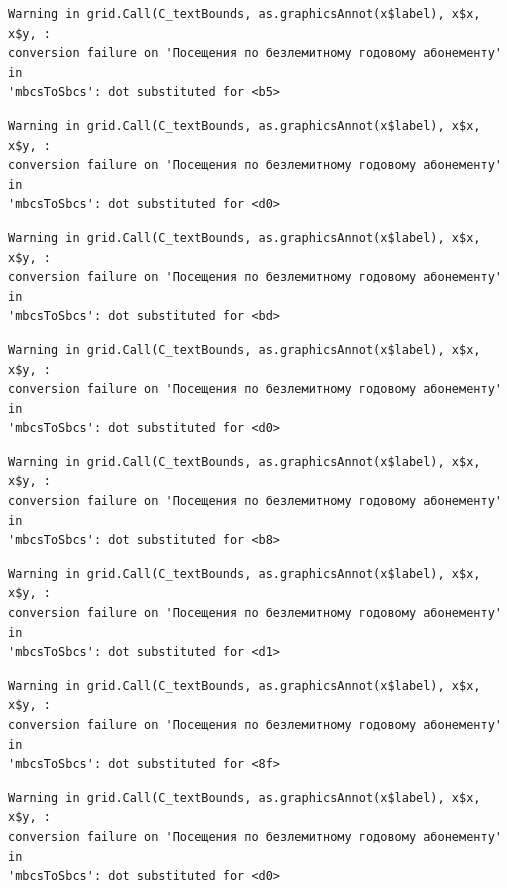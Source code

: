 \documentclass[
  letterpaper,
  DIV=11,
  numbers=noendperiod]{scrartcl}
\begin{document}
\begin{verbatim}
Warning in grid.Call(C_textBounds, as.graphicsAnnot(x$label), x$x, x$y, :
conversion failure on 'Посещения по безлемитному годовому абонементу' in
'mbcsToSbcs': dot substituted for <b5>
\end{verbatim}

\begin{verbatim}
Warning in grid.Call(C_textBounds, as.graphicsAnnot(x$label), x$x, x$y, :
conversion failure on 'Посещения по безлемитному годовому абонементу' in
'mbcsToSbcs': dot substituted for <d0>
\end{verbatim}

\begin{verbatim}
Warning in grid.Call(C_textBounds, as.graphicsAnnot(x$label), x$x, x$y, :
conversion failure on 'Посещения по безлемитному годовому абонементу' in
'mbcsToSbcs': dot substituted for <bd>
\end{verbatim}

\begin{verbatim}
Warning in grid.Call(C_textBounds, as.graphicsAnnot(x$label), x$x, x$y, :
conversion failure on 'Посещения по безлемитному годовому абонементу' in
'mbcsToSbcs': dot substituted for <d0>
\end{verbatim}

\begin{verbatim}
Warning in grid.Call(C_textBounds, as.graphicsAnnot(x$label), x$x, x$y, :
conversion failure on 'Посещения по безлемитному годовому абонементу' in
'mbcsToSbcs': dot substituted for <b8>
\end{verbatim}

\begin{verbatim}
Warning in grid.Call(C_textBounds, as.graphicsAnnot(x$label), x$x, x$y, :
conversion failure on 'Посещения по безлемитному годовому абонементу' in
'mbcsToSbcs': dot substituted for <d1>
\end{verbatim}

\begin{verbatim}
Warning in grid.Call(C_textBounds, as.graphicsAnnot(x$label), x$x, x$y, :
conversion failure on 'Посещения по безлемитному годовому абонементу' in
'mbcsToSbcs': dot substituted for <8f>
\end{verbatim}

\begin{verbatim}
Warning in grid.Call(C_textBounds, as.graphicsAnnot(x$label), x$x, x$y, :
conversion failure on 'Посещения по безлемитному годовому абонементу' in
'mbcsToSbcs': dot substituted for <d0>
\end{verbatim}
\end{document}
